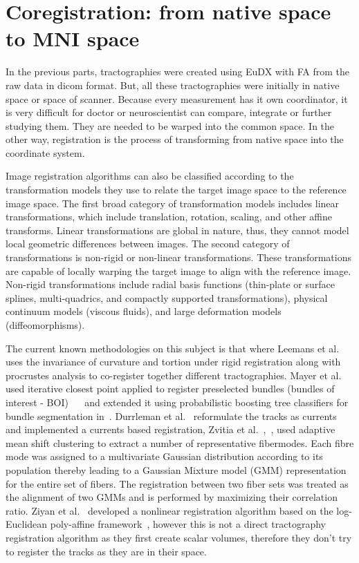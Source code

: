 

\section{Coregistration: from native space to MNI space}
In the previous parts, tractographies were created using EuDX with FA from the raw data in dicom format. But, all these tractographies were initially in native space or space of scanner. Because every measurement has it own coordinator, it is very difficult for doctor or neuroscientist can compare, integrate or further studying them. They are needed to be warped into the common space. In the other way, registration is the process of transforming from native space into the coordinate system.

Image registration algorithms can also be classified according to the transformation models they use to relate the target image space to the reference image space. The first broad category of transformation models includes linear transformations, which include translation, rotation, scaling, and other affine transforms. Linear transformations are global in nature, thus, they cannot model local geometric differences between images. The second category of transformations is non-rigid or non-linear transformations. These transformations are capable of locally warping the target image to align with the reference image. Non-rigid transformations include radial basis functions (thin-plate or surface splines, multi-quadrics, and compactly supported transformations), physical continuum models (viscous fluids), and large deformation models (diffeomorphisms). 

The current known methodologies on this subject is that where Leemans et al.~\cite{leemans2006multiscale} uses the invariance of curvature and tortion under rigid registration along with procrustes analysis to co-register together different tractographies. Mayer et al. used iterative closest point applied to register preselected bundles (bundles of interest - BOI)~\cite{mayer2008bundles} ~\cite{mayer2007registration} and extended it using probabilistic boosting tree classifiers for bundle segmentation in~\cite{mayer2011supervised}. Durrleman et al.~\cite{durrleman2010registration} reformulate the tracks as currents and implemented a currents based registration, Zvitia et al.~\cite{zvitia2008adaptive},~\cite{zvitia2010coregistration}, used adaptive mean shift clustering to extract a number of representative fibermodes. Each fibre mode was assigned to a multivariate Gaussian distribution according to its population thereby leading to a Gaussian Mixture model (GMM) representation for the entire set of fibers. The registration between two fiber sets was treated as the alignment of two GMMs and is performed by maximizing their correlation ratio. Ziyan et al.~\cite{ziyan2007nonlinear} developed a nonlinear registration algorithm based on the log-Euclidean poly-affine framework~\cite{arsigny2009fast}, however this is not a direct tractography registration algorithm as they first create scalar volumes, therefore they don’t try to register the tracks as they are in their space. 

